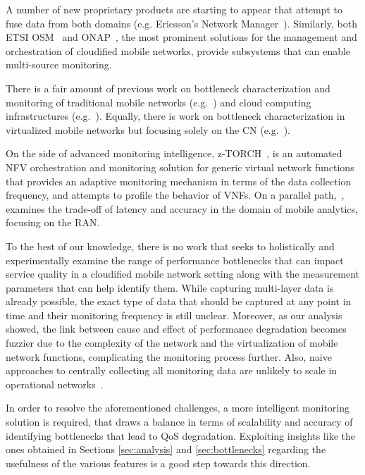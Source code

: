 \documentclass[journal,comsoc]{IEEEtran}
\begin{document}
%
A number of new proprietary products are starting to appear that attempt to fuse data from both domains (e.g. Ericsson's Network Manager~\cite{ericcson-nm}). Similarly, both ETSI OSM~\cite{etsi2016open} and ONAP~\cite{onap-2018}, the most prominent solutions for the management and orchestration of cloudified mobile networks, provide subsystems that can enable multi-source monitoring.

% 
There is a fair amount of previous work on bottleneck characterization and monitoring of traditional mobile networks (e.g.~\cite{rengaraju2012qoe,baranasuriya2015qprobe,iyer2017automating}) and cloud computing infrastructures (e.g.~\cite{calero2015monpaas,li2016flowradar,moshref2016trumpet,cao2015nfv,naik2016nfvperf,Kandula:2009:DDE:1592568.1592597}).
Equally, there is work on bottleneck characterization in virtualized mobile networks but focusing solely on the CN (e.g.~\cite{rajan2015understanding,prados2017modeling,raza2017rethinking}).

%
On the side of advanced monitoring intelligence, z-TORCH~\cite{sciancalepore2018z}, is an automated NFV orchestration and monitoring solution for generic virtual network functions that provides an adaptive monitoring mechanism in terms of the data collection frequency, and attempts to profile the behavior of VNFs. On a parallel path,~\cite{PadmanabhaIyerTradeoff}, examines the trade-off of latency and accuracy in the domain of mobile analytics, focusing on the RAN. 

%
To the best of our knowledge, there is no work that seeks to holistically and experimentally examine the range of performance bottlenecks that can impact service quality in a cloudified mobile network setting along with the measurement parameters that can help identify them.
While capturing multi-layer data is already possible, the exact type of data that should be captured at any point in time and their monitoring frequency is still unclear.
Moreover, as our analysis showed, the link between cause and effect of performance degradation becomes fuzzier due to the complexity of the network and the virtualization of mobile network functions, complicating the monitoring process further. Also, naive approaches to centrally collecting all monitoring data are unlikely to scale in operational networks~\cite{meng2011state, meng2012reliable, povedano2013dargos, onapmultisite}.

%
In order to resolve the aforementioned challenges, a more intelligent monitoring solution is required, that draws a balance in terms of scalability and accuracy of identifying bottlenecks that lead to QoS degradation. Exploiting insights like the ones obtained in Sections \ref{sec:analysis} and \ref{sec:bottlenecks} regarding the usefulness of the various features is a good step towards this direction.
\end{document}
